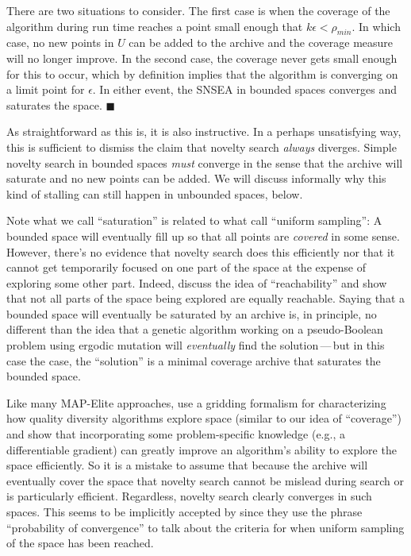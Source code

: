 \documentclass[twoside]{article}
\begin{document}
There are two situations to consider.  The first case is when the coverage of the algorithm during run time reaches a point small enough that $k\epsilon < \rho_{min}$.  In which case, no new points in $U$ can be added to the archive and the coverage measure will no longer improve.  In the second case, the coverage never gets small enough for this to occur, which by definition implies that the algorithm is converging on a limit point for $\epsilon$.  In either event, the SNSEA in bounded spaces converges and saturates the space. $\blacksquare$

\vspace*{1ex}

As straightforward as this is, it is also instructive.  In a perhaps unsatisfying way, this is sufficient to dismiss the claim that novelty search \emph{always} diverges.  Simple novelty search in bounded spaces \emph{must} converge in the sense that the archive will saturate and no new points can be added.  We will discuss informally why this kind of stalling can still happen in unbounded spaces, below.

Note what we call ``saturation'' is related to what \citet{Doncieux2019gecco} call ``uniform sampling'':  A bounded space will eventually fill up so that all points are \emph{covered} in some sense.  However, there's no evidence that novelty search does this efficiently nor that it cannot get temporarily focused on one part of the space at the expense of exploring some other part. Indeed, \citet{Doncieux2019gecco} discuss the idea of ``reachability'' and show that not all parts of the space being explored are equally reachable.  Saying that a bounded space will eventually be saturated by an archive is, in principle, no different than the idea that a genetic algorithm working on a pseudo-Boolean problem using ergodic mutation will \emph{eventually} find the solution\,---\,but in this case the case, the ``solution'' is a minimal coverage archive that saturates the bounded space.

Like many MAP-Elite approaches, \citet{Fontaine2021corr} use a gridding formalism for characterizing how quality diversity algorithms explore space (similar to our idea of ``coverage'') and show that incorporating some problem-specific knowledge (e.g., a differentiable gradient) can greatly improve an algorithm's ability to explore the space efficiently.  So it is a mistake to assume that because the archive will eventually cover the space that novelty search cannot be mislead during search or is particularly efficient.  Regardless, novelty search clearly converges in such spaces.  This seems to be implicitly accepted by \citet{Doncieux2019gecco} since they use the phrase ``probability of convergence'' to talk about the criteria for when uniform sampling of the space has been reached.
\end{document}
